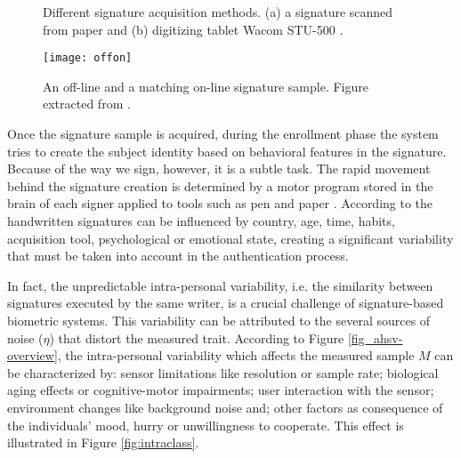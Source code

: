 \begin{figure}[!htpb]
\centering
\hspace*{0.5in} %
\caption{Different signature acquisition methods. (a) a signature scanned from paper and (b) digitizing tablet Wacom STU-500 \cite{wacom2016}. } \label{fig:acquisition}
\end{figure}

\begin{figure}[!htb]
\centering
\texttt{[image: offon]}
\caption{An off-line and a matching on-line signature sample. Figure extracted from \cite{sigcomp2009}.}
\label{fig:offon}
\end{figure}

%

Once the signature sample is acquired, during the enrollment phase the system tries to create the subject identity based on behavioral features in the signature. Because of the way we sign, however, it is a subtle task. The rapid movement behind the signature creation is determined by a motor program stored in the brain of each signer applied to tools such as pen and paper \cite{pirlo2014advances}. According to \cite{plamondon1989automatic} the handwritten signatures can be influenced by country, age, time, habits, acquisition tool, psychological or  emotional state, creating a significant variability that must be taken into account in the authentication process.

In fact, the unpredictable intra-personal variability, i.e. the similarity between signatures executed by the same writer, is a crucial challenge of signature-based biometric systems. This variability can be attributed to the several sources of noise ($\eta$) that distort the measured trait. According to Figure \ref{fig_ahsv-overview}, the intra-personal variability which affects the measured sample {\boldm $M$} can be characterized by: sensor limitations like resolution or sample rate; biological aging effects or cognitive-motor impairments; user interaction with the sensor; environment changes like background noise and; other factors as consequence of the individuals’ mood, hurry or unwillingness to cooperate. This effect is illustrated in Figure \ref{fig:intraclass}.

